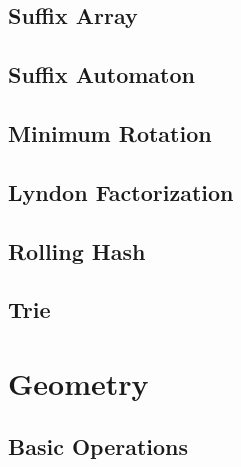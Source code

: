 \documentclass[a4paper,10pt,twocolumn,oneside,x11names]{article}
\begin{document}
\subsection{Suffix Array}



\subsection{Suffix Automaton}


%

\subsection{Minimum Rotation}


\subsection{Lyndon Factorization}


\subsection{Rolling Hash}


\subsection{Trie}


% 

\section{Geometry}

\subsection{Basic Operations}

\end{document}

